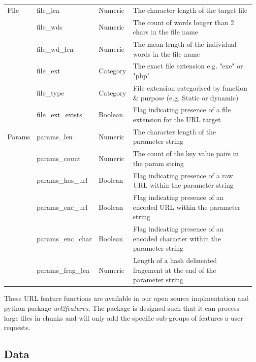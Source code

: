 \documentclass[sigconf]{acmart}
\begin{document}
\begin{table}
\begin{tabular}{|l|l|l|l|}
\midrule 
File          &file\_len              &Numeric     &The character length of the target file    \\
              &file\_wds              &Numeric     &The count of words longer than 2 chars in the file name   \\
              &file\_wd\_len          &Numeric     &The mean length of the individual words in the file name  \\
              &file\_ext              &Category    &The exact file extension e.g. "exe" or "php"    \\
              &file\_type             &Category    &File extension categorised by function \& purpose (e.g. Static or dynamic)   \\
              &file\_ext\_exists      &Boolean     &Flag indicating presence of a file extension for the URL target  \\
\midrule
Params        &params\_len            &Numeric     &The character length of the parameter string    \\
              &params\_count          &Numeric     &The count of the key value pairs in the param string    \\
              &params\_has\_url       &Boolean     &Flag indicating presence of a raw URL within the parameter string   \\
              &params\_enc\_url       &Boolean     &Flag indicating presence of an encoded URL within the parameter string   \\
              &params\_enc\_char      &Boolean     &Flag indicating presence of an encoded character within the parameter string   \\
              &params\_frag\_len      &Numeric     &Length of a hash delineated fragement at the end of the parameter string   \\
\bottomrule
\end{tabular}
\end{table}


These URL feature functions are available in our open source implmentation and python package \emph{url2features}. 
The package is designed such that it can process large files in chunks and will only add the specific sub-groups of
features a user requests.


\subsection{Data}
\end{document}
